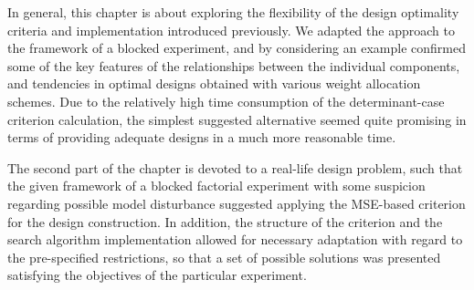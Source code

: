 In general, this chapter is about exploring the flexibility of the design optimality criteria and implementation introduced previously. We adapted the approach to the framework of a blocked experiment, and by considering an example confirmed some of the key features of the relationships between the individual components, and tendencies in optimal designs obtained with various weight allocation schemes. Due to the relatively high time consumption of the determinant-case criterion calculation, the simplest suggested alternative seemed quite promising in terms of providing adequate designs in a much more reasonable time.

The second part of the chapter is devoted to a real-life design problem, such that the given framework of a blocked factorial experiment with some suspicion regarding possible model disturbance suggested applying the MSE-based criterion for the design construction. In addition, the structure of the criterion and the search algorithm implementation allowed for necessary adaptation with regard to the pre-specified restrictions, so that a set of possible solutions was presented satisfying the objectives of the particular experiment. 

